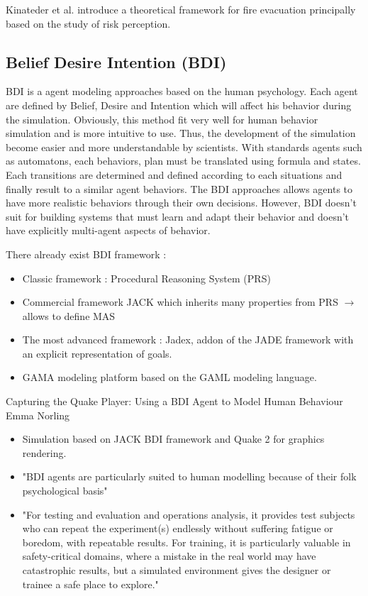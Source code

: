             Kinateder et al. introduce a theoretical framework for fire evacuation principally based on the study of risk perception. \cite{review2014}

        \subsection{Belief Desire Intention (BDI)}

            BDI is a agent modeling approaches based on the human psychology. Each agent are defined by Belief, Desire and Intention which will affect his behavior during the simulation. Obviously, this method fit very well for human behavior simulation and is more intuitive to use. Thus, the development of the simulation become easier and more understandable by scientists.
            With standards agents such as automatons, each behaviors, plan must be translated using formula and states. Each transitions are determined and defined according to each situations and finally result to a similar agent behaviors. The BDI approaches allows agents to have more realistic behaviors through their own decisions. 
            However, BDI doesn't suit for building systems that must learn and adapt their behavior and doesn't have explicitly multi-agent aspects of behavior. \cite{bdi1999}

            There already exist BDI framework \cite{simple2015}:
            \begin{itemize}
                \item Classic framework : Procedural Reasoning System (PRS)
                \item Commercial framework JACK which inherits many properties from PRS $\rightarrow$ allows to define MAS
                \item The most advanced framework : Jadex, addon of the JADE framework with an explicit representation of goals.
                \item GAMA modeling platform based on the GAML modeling language.
            \end{itemize}

            Capturing the Quake Player: Using a BDI Agent to Model Human Behaviour
            Emma Norling
            \begin{itemize}
                \item Simulation based on JACK BDI framework and Quake 2 for graphics rendering.
                \item "BDI agents are particularly suited to human modelling because of their folk psychological basis"
                \item "For testing and evaluation and operations analysis, it provides test subjects who can repeat the experiment(s) endlessly without suffering fatigue or boredom, with repeatable results. For training, it is particularly valuable in safety-critical domains, where a mistake in the real world may have catastrophic results, but a simulated environment gives the designer or trainee a safe place to explore."
            \end{itemize}

